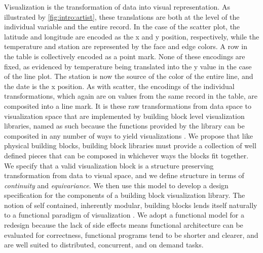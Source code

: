 \documentclass[../main.tex]{subfiles}
\begin{document}
Visualization is the transformation of data into visual representation. As illustrated by \autoref{fig:intro:artist}, these translations are both at the level of the individual variable and the entire record. In the case of the scatter plot, the latitude and longitude are encoded as the x and y position, respectively, while the temperature and station are represented by the face and edge colors. A row in the table is collectively encoded as a point mark. None of these encodings are fixed, as evidenced by temperature being translated into the y value in the case of the line plot. The station is now the source of the color of the entire line, and the date is the x position. As with scatter, the encodings of the individual transformations, which again are on values from the same record in the table, are composited into a line mark. It is these raw transformations from data space to visualization space that are implemented by building block level visualization libraries, named as such because the functions provided by the library can be composited in any number of ways to yield visualizations \cite{wongsuphasawatNavigatingWideWorld2021}. We propose that like physical building blocks, building block libraries must provide a collection of well defined pieces that can be composed in whichever ways the blocks fit together. We specify that a valid visualization block is a structure preserving transformation from data to visual space, and we define structure in terms of \textit{continuity} and \textit{equivariance}. We then use this model to develop a design specification for the components of a building block visualization library. The notion of self contained, inherently modular, building blocks lends itself naturally to a functional paradigm of visualization \cite{hughesWhyFunctionalProgramming1989}. We adopt a functional model for a redesign because the lack of side effects means functional architecture can be evaluated for correctness, functional programs tend to be shorter and clearer, and are well suited to distributed, concurrent, and on demand tasks\cite{huHowFunctionalProgramming2015}.
\end{document}
